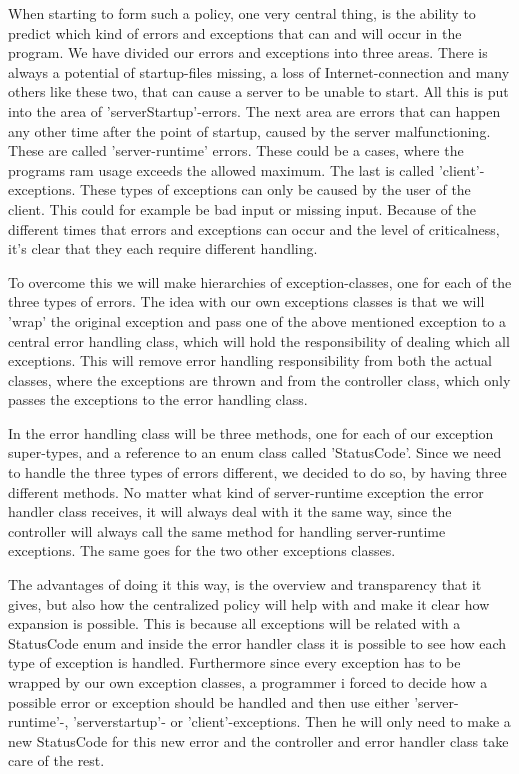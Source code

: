 \documentclass[a4paper,10pt,titlepage]{article}
\begin{document}
When starting to form such a policy, one very central thing, is the ability to predict which kind of errors and exceptions that can and will occur in the program. We have divided our errors and exceptions into three areas. There is always a potential of startup-files missing, a loss of Internet-connection and many others like these two, that can cause a server to be unable to start. All this is put into the area of 'serverStartup'-errors. The next area are errors that can happen any other time after the point of startup, caused by the server malfunctioning. These are called 'server-runtime' errors. These could be a cases, where the programs ram usage exceeds the allowed maximum. The last is called 'client'-exceptions. These types of exceptions can only be caused by the user of the client. This could for example be bad input or missing input.  Because of the different times that errors and exceptions can occur and the level of criticalness, it's clear that they each require different handling.

To overcome this we will make hierarchies of exception-classes, one for each of the three types of errors. The idea with our own exceptions classes is that we will 'wrap' the original exception and pass one of the above mentioned exception to a central error handling class, which will hold the responsibility of dealing which all exceptions. This will remove error handling responsibility from both the actual classes, where the exceptions are thrown and from the controller class, which only passes the exceptions to the error handling class.

 In the error handling class will be three methods, one for each of our exception super-types, and a reference to an enum class called 'StatusCode'. Since we need to handle the three types of errors different, we decided to do so, by having three different methods. No matter what kind of server-runtime exception the error handler class receives, it will always deal with it the same way, since the controller will always call the same method for handling server-runtime exceptions. The same goes for the two other exceptions classes.

The advantages of doing it this way, is the overview and transparency that it gives, but also how the centralized policy will help with and make it clear how expansion is possible. This is because all exceptions will be related with a StatusCode enum and inside the error handler class it is possible to see how each type of exception is handled. Furthermore since every exception has to be wrapped by our own exception classes, a programmer i forced to decide how a possible error or exception should be handled and then use either 'server-runtime'-, 'serverstartup'- or 'client'-exceptions. Then he will only need to make a new StatusCode for this new error and the controller and error handler class take care of the rest.
\end{document}
